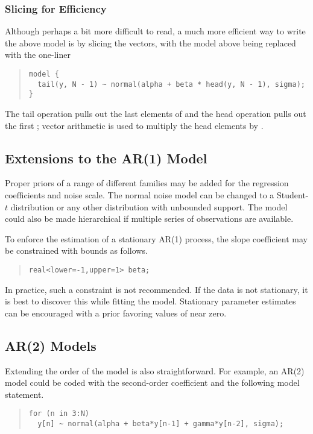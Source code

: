 \subsubsection{Slicing for Efficiency}

Although perhaps a bit more difficult to read, a much more efficient
way to write the above model is by slicing the vectors, with the model
above being replaced with the one-liner
%
\begin{quote}
\begin{Verbatim}
model {
  tail(y, N - 1) ~ normal(alpha + beta * head(y, N - 1), sigma);
}
\end{Verbatim}
\end{quote}
%
The tail operation pulls out the last  elements of
 and the head operation pulls out the first ;
vector arithmetic is used to multiply the head elements by
.  



\subsection{Extensions to the AR(1) Model} 

Proper priors of a range of different families may be added for the
regression coefficients and noise scale.  The normal noise model can
be changed to a Student-$t$ distribution or any other distribution
with unbounded support.  The model could also be made hierarchical if
multiple series of observations are available.  

To enforce the estimation of a stationary AR(1) process, the slope
coefficient  may be constrained with bounds as follows.
%
\begin{quote}
\begin{Verbatim}[fontsize=\small]
real<lower=-1,upper=1> beta;
\end{Verbatim}
\end{quote}
%
In practice, such a constraint is not recommended.  If the data is not
stationary, it is best to discover this while fitting the model.
Stationary parameter estimates can be encouraged with a prior favoring
values of  near zero.


\subsection{AR(2) Models}

Extending the order of the model is also straightforward.  For
example, an AR(2) model could be coded with the second-order
coefficient  and the following model statement.
%
\begin{quote}
\begin{Verbatim}[fontsize=\small]
for (n in 3:N)
  y[n] ~ normal(alpha + beta*y[n-1] + gamma*y[n-2], sigma);
\end{Verbatim}
\end{quote}


